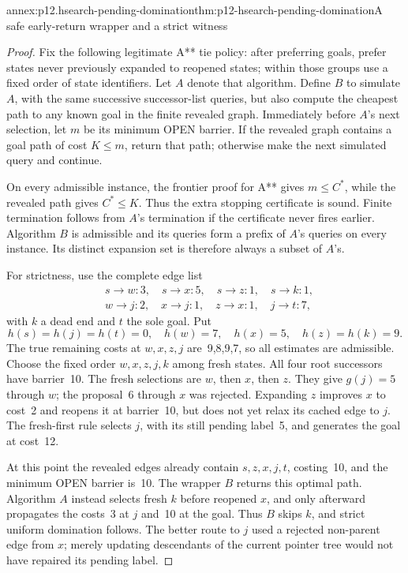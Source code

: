 \begin{annexitem}{annex:p12.hsearch-pending-domination}{thm:p12-hsearch-pending-domination}{A safe early-return wrapper and a strict witness}
\begin{proof}
Fix the following legitimate A** tie policy: after preferring goals,
prefer states never previously expanded to reopened states; within those
groups use a fixed order of state identifiers. Let \(A\) denote that
algorithm. Define \(B\) to simulate \(A\), with the same successive
successor-list queries, but also compute the cheapest path to any known
goal in the finite revealed graph. Immediately before \(A\)'s next
selection, let \(m\) be its minimum OPEN barrier. If the revealed
graph contains a goal path of cost \(K\le m\), return that path;
otherwise make the next simulated query and continue.

On every admissible instance, the frontier proof for A** gives
\(m\le C^*\), while the revealed path gives \(C^*\le K\).
Thus the extra stopping certificate is sound. Finite termination follows
from \(A\)'s termination if the certificate never fires earlier.
Algorithm \(B\) is admissible and its queries form a prefix of
\(A\)'s queries on every instance. Its distinct expansion set is
therefore always a subset of \(A\)'s.

For strictness, use the complete edge list
\[
\begin{split}
 &s\to w:3,\quad s\to x:5,\quad s\to z:1,\quad s\to k:1,\\
 &w\to j:2,\quad x\to j:1,\quad z\to x:1,\quad j\to t:7,
\end{split}
\]
with \(k\) a dead end and \(t\) the sole goal. Put
\[
 h(s)=h(j)=h(t)=0,\quad h(w)=7,\quad h(x)=5,
 \quad h(z)=h(k)=9.
\]
The true remaining costs at \(w,x,z,j\) are~9,8,9,7, so all
estimates are admissible. Choose the fixed order
\(w,x,z,j,k\) among fresh states. All four root successors have
barrier~10. The fresh selections are \(w\), then \(x\), then
\(z\). They give \(g(j)=5\) through \(w\); the proposal~6
through \(x\) was rejected. Expanding \(z\) improves \(x\)
to cost~2 and reopens it at barrier~10, but does not yet relax its cached
edge to \(j\). The fresh-first rule selects \(j\), with its
still pending label~5, and generates the goal at cost~12.

At this point the revealed edges already contain
\(s,z,x,j,t\), costing~10, and the minimum OPEN barrier is~10.
The wrapper \(B\) returns this optimal path. Algorithm \(A\)
instead selects fresh \(k\) before reopened \(x\), and only
afterward propagates the costs~3 at \(j\) and~10 at the goal.
Thus \(B\) skips \(k\), and strict uniform domination follows.
The better route to \(j\) used a rejected non-parent edge from
\(x\); merely updating descendants of the current pointer tree
would not have repaired its pending label.
\end{proof}
\end{annexitem}


